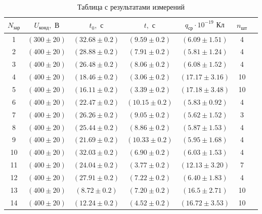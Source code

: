 \documentclass{lab}
\begin{document}
\begin{table}[H]
	\centering
	\begin{tabular}{|c|c|c|c|c|c|c|}
		\hline
		$N_\text{зар}$ & $U_\text{конд}, \text{ В}$ & $t_0, \text{ с} $ & $t, \text{ с} $   & $q_\text{ср} \cdot 10^{-19}\text{ Кл}$ & $n_\text{шт}$ \\
		\hline
		1              & $(300 \pm 20)$             & $(32.68 \pm 0.2)$ & $(9.59 \pm 0.2)$  & $(6.09   \pm 1.51)$                    & 4             \\
		2              & $(400 \pm 20)$             & $(28.88 \pm 0.2)$ & $(7.91 \pm 0.2)$  & $(5.81   \pm 1.24)$                    & 4             \\
		3              & $(400 \pm 20)$             & $(26.48 \pm 0.2)$ & $(8.06 \pm 0.2)$  & $(6.08   \pm 1.52)$                    & 4             \\
		4              & $(400 \pm 20)$             & $(18.46 \pm 0.2)$ & $(3.06 \pm 0.2)$  & $(17.17  \pm 3.16)$                    & 10            \\
		5              & $(400 \pm 20)$             & $(16.11 \pm 0.2)$ & $(3.39 \pm 0.2)$  & $(17.18  \pm 3.48)$                    & 10            \\
		6              & $(400 \pm 20)$             & $(22.47 \pm 0.2)$ & $(10.15 \pm 0.2)$ & $(5.83  \pm 0.92)$                     & 4             \\
		7              & $(400 \pm 20)$             & $(26.26 \pm 0.2)$ & $(9.05 \pm 0.2)$  & $(5.62   \pm 1.52)$                    & 3             \\
		8              & $(400 \pm 20)$             & $(25.44 \pm 0.2)$ & $(8.86 \pm 0.2)$  & $(5.87   \pm 1.53)$                    & 4             \\
		9              & $(400 \pm 20)$             & $(21.69 \pm 0.2)$ & $(10.33 \pm 0.2)$ & $(5.95  \pm 1.68)$                     & 4             \\
		10             & $(400 \pm 20)$             & $(32.03 \pm 0.2)$ & $(6.90 \pm 0.2)$  & $(6.03  \pm 1.53)$                     & 4             \\
		11             & $(400 \pm 20)$             & $(24.04 \pm 0.2)$ & $(3.77 \pm 0.2)$  & $(12.13 \pm 3.20)$                     & 7             \\
		12             & $(400 \pm 20)$             & $(27.91 \pm 0.2)$ & $(7.22 \pm 0.2)$  & $(6.40  \pm 1.83)$                     & 4             \\
		13             & $(400 \pm 20)$             & $(8.72 \pm 0.2)$  & $(7.20 \pm 0.2)$  & $(16.5   \pm 2.71)$                    & 10            \\
		14             & $(400 \pm 20)$             & $(12.24 \pm 0.2)$ & $(4.52 \pm 0.2)$  & $(16.72 \pm 3.53)$                     & 10            \\
		\hline
	\end{tabular}
	\caption{Таблица с результатами измерений}
\end{table}
\end{document}
